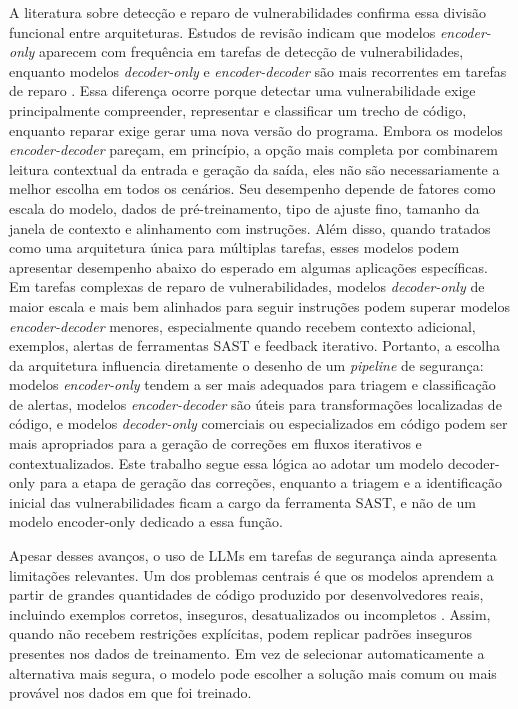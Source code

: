 A literatura sobre detecção e reparo de vulnerabilidades confirma essa divisão funcional entre arquiteturas. Estudos de revisão indicam que modelos \textit{encoder-only} aparecem com frequência em tarefas de detecção de vulnerabilidades, enquanto modelos \textit{decoder-only} e \textit{encoder-decoder} são mais recorrentes em tarefas de reparo \cite{zhou_large_2024}. Essa diferença ocorre porque detectar uma vulnerabilidade exige principalmente compreender, representar e classificar um trecho de código, enquanto reparar exige gerar uma nova versão do programa. Embora os modelos \textit{encoder-decoder} pareçam, em princípio, a opção mais completa por combinarem leitura contextual da entrada e geração da saída, eles não são necessariamente a melhor escolha em todos os cenários. Seu desempenho depende de fatores como escala do modelo, dados de pré-treinamento, tipo de ajuste fino, tamanho da janela de contexto e alinhamento com instruções. Além disso, quando tratados como uma arquitetura única para múltiplas tarefas, esses modelos podem apresentar desempenho abaixo do esperado em algumas aplicações específicas. Em tarefas complexas de reparo de vulnerabilidades, modelos \textit{decoder-only} de maior escala e mais bem alinhados para seguir instruções podem superar modelos \textit{encoder-decoder} menores, especialmente quando recebem contexto adicional, exemplos, alertas de ferramentas SAST e feedback iterativo. Portanto, a escolha da arquitetura influencia diretamente o desenho de um \textit{pipeline} de segurança: modelos \textit{encoder-only} tendem a ser mais adequados para triagem e classificação de alertas, modelos \textit{encoder-decoder} são úteis para transformações localizadas de código, e modelos \textit{decoder-only} comerciais ou especializados em código podem ser mais apropriados para a geração de correções em fluxos iterativos e contextualizados. Este trabalho segue essa lógica ao adotar um modelo decoder-only para a etapa de geração das correções, enquanto a triagem e a identificação inicial das vulnerabilidades ficam a cargo da ferramenta SAST, e não de um modelo encoder-only dedicado a essa função.

Apesar desses avanços, o uso de LLMs em tarefas de segurança ainda apresenta limitações relevantes. Um dos problemas centrais é que os modelos aprendem a partir de grandes quantidades de código produzido por desenvolvedores reais, incluindo exemplos corretos, inseguros, desatualizados ou incompletos \cite{chen_evaluating_2021}. Assim, quando não recebem restrições explícitas, podem replicar padrões inseguros presentes nos dados de treinamento. Em vez de selecionar automaticamente a alternativa mais segura, o modelo pode escolher a solução mais comum ou mais provável nos dados em que foi treinado.

